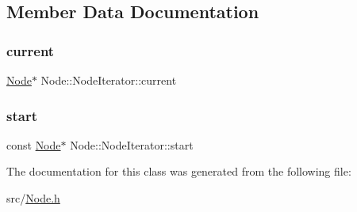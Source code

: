 \subsection{Member Data Documentation}
\mbox{\label{class_node_1_1_node_iterator_aef4bbf58890919058172facd8b91238a}} 
\subsubsection{\texorpdfstring{current}{current}}
{\footnotesize\ttfamily \hyperlink{class_node}{Node}$\ast$ Node\+::\+Node\+Iterator\+::current\hspace{0.3cm}{\ttfamily [protected]}}

\mbox{\label{class_node_1_1_node_iterator_a7f1dc14103049a99cd9929946ecbd0f0}} 
\subsubsection{\texorpdfstring{start}{start}}
{\footnotesize\ttfamily const \hyperlink{class_node}{Node}$\ast$ Node\+::\+Node\+Iterator\+::start\hspace{0.3cm}{\ttfamily [protected]}}



The documentation for this class was generated from the following file\+:\begin{DoxyCompactItemize}
\item 
src/\hyperlink{_node_8h}{Node.\+h}\end{DoxyCompactItemize}
